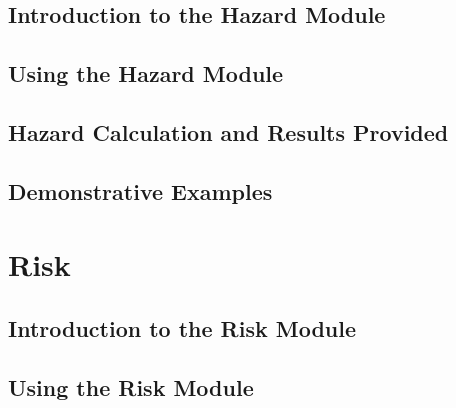 \documentclass[11pt,fleqn]{book} %
\begin{document}
\chapter{Introduction to the Hazard Module}
   \label{chap:oqhazintro}
	
   
   
   \cleardoublepage

\chapter{Using the Hazard Module}
	\label{chap:hazinp}
	
   \cleardoublepage

\chapter{Hazard Calculation and Results Provided}
	\label{chap:hazout}
	
   \cleardoublepage

\chapter{Demonstrative Examples}
	\label{chap:hazdemo}
	
   \cleardoublepage

\thispagestyle{empty}
\part{Risk}

\chapter{Introduction to the Risk Module}
   \label{chap:oqriskintro}
	
   \cleardoublepage

\chapter{Using the Risk Module}
	\label{chap:riskmodule}
	
   \cleardoublepage
\end{document}
